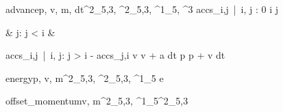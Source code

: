 \documentclass[12pt,a4paper]{book}
\begin{document}
\begin{eqcode}{advance}{p, v, m, dt}{^2_{5,3}, ^2_{5,3}, ^1_5, }{^3}
    accs_{i,j}\  |\  i, j : 0 \leq i   \leq j  \gets
        \begin{cases}
             & j:  j < i  & \otherwise \lend
        \end{cases} \lend
    accs_{i,j}\  |\  i, j:  j > i \gets - accs_{j,i} \lend
    v \gets v + a \cdot dt \lend
    p \gets p + v \cdot dt \lend
\end{eqcode}

\begin{eqcode}{energy}{p, v, m}{^2_{5,3},
    ^2_{5,3}, ^1_5}{}
    e \in {} \lend
     \lend
\end{eqcode}

\begin{eqcode}{offset\_momentum}{v, m}{^2_{5,3}, 
    ^1_5}{^2_{5,3}}
     \lend
\end{eqcode}
\end{document}
